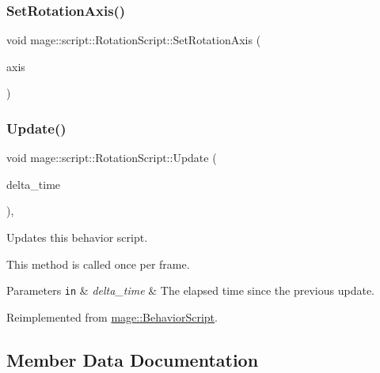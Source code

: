 \subsubsection{\texorpdfstring{Set\+Rotation\+Axis()}{SetRotationAxis()}}
{\footnotesize\ttfamily void mage\+::script\+::\+Rotation\+Script\+::\+Set\+Rotation\+Axis (\begin{DoxyParamCaption}\item[{\hyperlink{classmage_1_1script_1_1_rotation_script_aa8a91cc8c771fc777ffb5e8a28c43ad2}{Rotation\+Axis}}]{axis }\end{DoxyParamCaption})\hspace{0.3cm}{\ttfamily [noexcept]}}

\hypertarget{classmage_1_1script_1_1_rotation_script_a868768482599b478e8fd8afe371b6c54}{}\label{classmage_1_1script_1_1_rotation_script_a868768482599b478e8fd8afe371b6c54} 
\subsubsection{\texorpdfstring{Update()}{Update()}}
{\footnotesize\ttfamily void mage\+::script\+::\+Rotation\+Script\+::\+Update (\begin{DoxyParamCaption}\item[{\mbox{[}\mbox{[}maybe\+\_\+unused\mbox{]} \mbox{]} \hyperlink{namespacemage_ad26233bbec640deda836e572c1a23708}{F64}}]{delta\+\_\+time }\end{DoxyParamCaption})\hspace{0.3cm}{\ttfamily [override]}, {\ttfamily [virtual]}}

Updates this behavior script.

This method is called once per frame.


\begin{DoxyParams}[1]{Parameters}
\mbox{\tt in}  & {\em delta\+\_\+time} & The elapsed time since the previous update. \\
\hline
\end{DoxyParams}


Reimplemented from \hyperlink{classmage_1_1_behavior_script_afb9cf3759edf8876416d1df85489cba6}{mage\+::\+Behavior\+Script}.



\subsection{Member Data Documentation}
\hypertarget{classmage_1_1script_1_1_rotation_script_a334c42c3ca6af6c2713c98ba4151cdbb}{}\label{classmage_1_1script_1_1_rotation_script_a334c42c3ca6af6c2713c98ba4151cdbb} 
